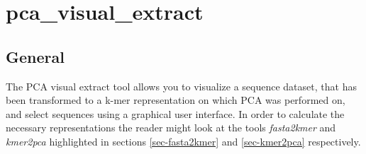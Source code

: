 \section{pca\_visual\_extract} \label{sec-pcavisual}

\subsection{General}

The PCA visual extract tool allows you to visualize a sequence dataset,
that has been transformed to a k-mer representation on which PCA was performed
on, and select sequences using a graphical user interface. In order to
calculate the necessary representations the reader might look at the tools
\emph{fasta2kmer} and \emph{kmer2pca} highlighted in sections
\ref{sec-fasta2kmer} and \ref{sec-kmer2pca} respectively.

